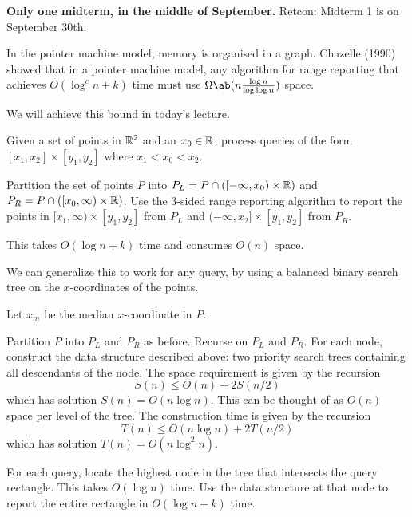 
\textbf{Only one midterm, in the middle of September.}
Retcon: Midterm 1 is on September 30th.

In the pointer machine model, memory is organised in a graph.
Chazelle (1990) showed that in a pointer machine model, any algorithm
for range reporting that achieves $O(\log^c n + k)$ time must use
$\Omega\ab(n \frac{\log n}{\log \log n})$ space.

We will achieve this bound in today's lecture.

\begin{question*} \label{que:ors:special}
    Given a set of points in $\mathbb{R}^2$ and an $x_0 \in \mathbb{R}$,
    process queries of the form
    $[x_1, x_2] \times [y_1, y_2]$ where $x_1 < x_0 < x_2$.
\end{question*}
\begin{solution}
    Partition the set of points $P$ into
    $P_L = P \cap ([-\infty, x_0) \times \mathbb{R})$
    and $P_R = P \cap ([x_0, \infty) \times \mathbb{R})$.
    Use the 3-sided range reporting algorithm to report the points in
    $[x_1, \infty) \times [y_1, y_2]$ from $P_L$ and
    $(-\infty, x_2] \times [y_1, y_2]$ from $P_R$.

    This takes $O(\log n + k)$ time and consumes $O(n)$ space.
\end{solution}

We can generalize this to work for any query, by using a balanced binary
search tree on the $x$-coordinates of the points.
\begin{solution}
    Let $x_m$ be the median $x$-coordinate in $P$.

    Partition $P$ into $P_L$ and $P_R$ as before.
    Recurse on $P_L$ and $P_R$.
    For each node, construct the data structure described above:
    two priority search trees containing all descendants of the node.
    The space requirement is given by the recursion \[
        S(n) \le O(n) + 2S(n/2)
    \] which has solution $S(n) = O(n \log n)$.
    This can be thought of as $O(n)$ space per level of the tree.
    The construction time is given by the recursion \[
        T(n) \le O(n \log n) + 2T(n/2)
    \] which has solution $T(n) = O(n \log^2 n)$.

    For each query, locate the highest node in the tree that intersects
    the query rectangle.
    This takes $O(\log n)$ time.
    Use the data structure at that node to report the entire rectangle in
    $O(\log n + k)$ time.
\end{solution}

